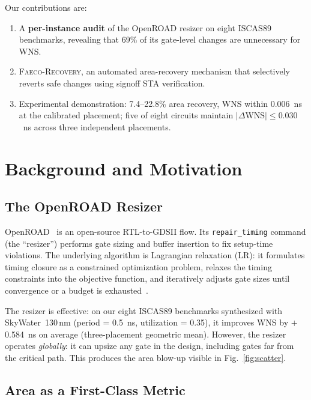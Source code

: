 \documentclass[journal]{IEEEtran}
\begin{document}
Our contributions are:
\begin{enumerate}
\item A \textbf{per-instance audit} of the OpenROAD resizer on eight
ISCAS89 benchmarks, revealing that 69\% of its gate-level changes are
unnecessary for WNS.
\item \textsc{Faeco-Recovery}, an automated area-recovery mechanism that
selectively reverts safe changes using signoff STA verification.
\item Experimental demonstration: 7.4--22.8\% area recovery, WNS within
0.006~ns at the calibrated placement; five of eight circuits maintain
$|\Delta\text{WNS}| \le 0.030$~ns across three independent placements.
\end{enumerate}

\section{Background and Motivation}

\subsection{The OpenROAD Resizer}

OpenROAD~\cite{openroad2020} is an open-source RTL-to-GDSII flow. Its
\texttt{repair\_timing} command (the ``resizer'') performs gate sizing and
buffer insertion to fix setup-time violations. The underlying algorithm is
Lagrangian relaxation (LR): it formulates timing closure as a constrained
optimization problem, relaxes the timing constraints into the objective
function, and iteratively adjusts gate sizes until convergence or a
budget is exhausted~\cite{chen1999lr}.

The resizer is effective: on our eight ISCAS89 benchmarks synthesized with
SkyWater~130\,nm (period = 0.5~ns, utilization = 0.35), it improves WNS
by $+$0.584~ns on average (three-placement geometric mean). However, the
resizer operates \emph{globally}: it can upsize any gate in the design,
including gates far from the critical path. This produces the area
blow-up visible in Fig.~\ref{fig:scatter}.

\subsection{Area as a First-Class Metric}
\end{document}
